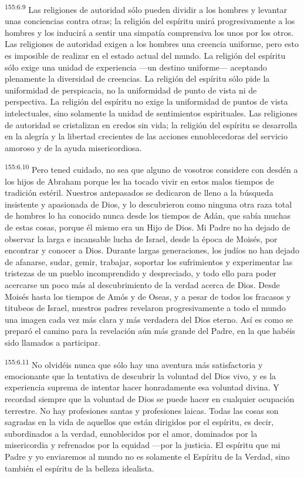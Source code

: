 \par
\textsuperscript{155:6.9} Las religiones de autoridad sólo pueden dividir a los hombres y levantar unas conciencias contra otras; la religión del espíritu unirá progresivamente a los hombres y los inducirá a sentir una simpatía comprensiva los unos por los otros. Las religiones de autoridad exigen a los hombres una creencia uniforme, pero esto es imposible de realizar en el estado actual del mundo. La religión del espíritu sólo exige una unidad de experiencia ---un destino uniforme--- aceptando plenamente la diversidad de creencias. La religión del espíritu sólo pide la uniformidad de perspicacia, no la uniformidad de punto de vista ni de perspectiva. La religión del espíritu no exige la uniformidad de puntos de vista intelectuales, sino solamente la unidad de sentimientos espirituales. Las religiones de autoridad se cristalizan en credos sin vida; la religión del espíritu se desarrolla en la alegría y la libertad crecientes de las acciones ennoblecedoras del servicio amoroso y de la ayuda misericordiosa.

\par
\textsuperscript{155:6.10} Pero tened cuidado, no sea que alguno de vosotros considere con desdén a los hijos de Abraham porque les ha tocado vivir en estos malos tiempos de tradición estéril. Nuestros antepasados se dedicaron de lleno a la búsqueda insistente y apasionada de Dios, y lo descubrieron como ninguna otra raza total de hombres lo ha conocido nunca desde los tiempos de Adán, que sabía muchas de estas cosas, porque él mismo era un Hijo de Dios. Mi Padre no ha dejado de observar la larga e incansable lucha de Israel, desde la época de Moisés, por encontrar y conocer a Dios. Durante largas generaciones, los judíos no han dejado de afanarse, sudar, gemir, trabajar, soportar los sufrimientos y experimentar las tristezas de un pueblo incomprendido y despreciado, y todo ello para poder acercarse un poco más al descubrimiento de la verdad acerca de Dios. Desde Moisés hasta los tiempos de Amós y de Oseas, y a pesar de todos los fracasos y titubeos de Israel, nuestros padres revelaron progresivamente a todo el mundo una imagen cada vez más clara y más verdadera del Dios eterno. Así es como se preparó el camino para la revelación aún más grande del Padre, en la que habéis sido llamados a participar.

\par
\textsuperscript{155:6.11} No olvidéis nunca que sólo hay una aventura más satisfactoria y emocionante que la tentativa de descubrir la voluntad del Dios vivo, y es la experiencia suprema de intentar hacer honradamente esa voluntad divina. Y recordad siempre que la voluntad de Dios se puede hacer en cualquier ocupación terrestre. No hay profesiones santas y profesiones laicas. Todas las cosas son sagradas en la vida de aquellos que están dirigidos por el espíritu, es decir, subordinados a la verdad, ennoblecidos por el amor, dominados por la misericordia y refrenados por la equidad ---por la justicia. El espíritu que mi Padre y yo enviaremos al mundo no es solamente el Espíritu de la Verdad, sino también el espíritu de la belleza idealista.

